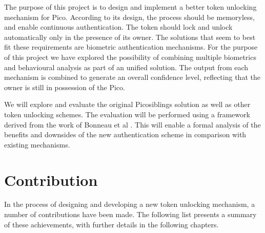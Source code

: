 The purpose of this project is to design and implement a better token unlocking mechanism for Pico. According to its design, the process should be memoryless, and enable continuous authentication. The token should lock and unlock automatically only in the presence of its owner. The solutions that seem to best fit these requirements are biometric authentication mechanisms. For the purpose of this project we have explored the possibility of combining multiple biometrics and behavioural analysis as part of an unified solution. The output from each mechanism is combined to generate an overall confidence level, reflecting that the owner is still in possession of the Pico.

We will explore and evaluate the original Picosiblings solution as well as other token unlocking schemes. The evaluation will be performed using a framework derived from the work of Bonneau et al \cite{bonneau2012quest}. This will enable a formal analysis of the benefits and downsides of the new authentication scheme in comparison with existing mechanisms. 

\section*{Contribution}
In the process of designing and developing a new token unlocking mechanism, a number of contributions have been made. The following list presents a summary of these achievements, with further details in the following chapters.

